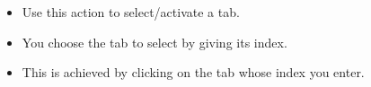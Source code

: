 \begin{itemize}
\item Use this action to select/activate a tab.
\item You choose the tab to select by giving its index.
\item This is achieved by clicking on the tab whose index you enter.
\end{itemize}
 

